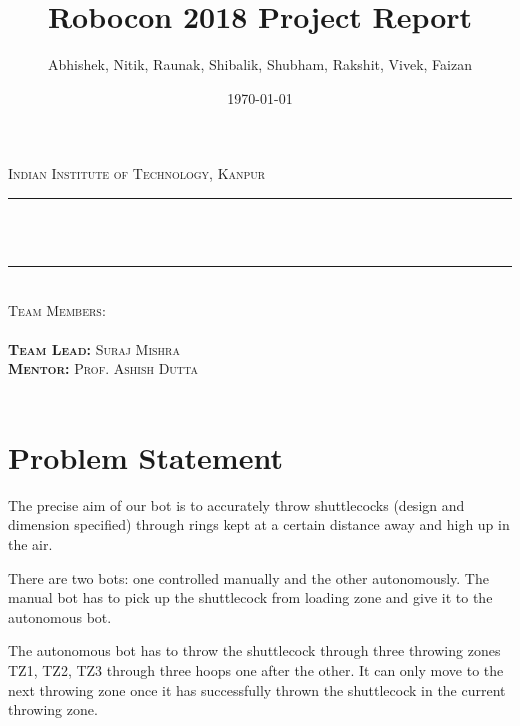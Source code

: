 \documentclass[11pt]{article}
\title{Robocon 2018 Project Report}%
\author{Abhishek, Nitik, Raunak, Shibalik, Shubham, Rakshit, Vivek, Faizan}%
\date{\today}%
\makeatletter
\let\thetitle\@title
\let\theauthor\@author
\let\thedate\@date
\makeatother
\begin{document}

\begin{titlepage}
    \centering
    \vspace*{0.5 cm}
    \textsc{\LARGE Indian Institute of Technology, Kanpur}\\[1 cm]   %
    \rule{\linewidth}{0.2 mm} \\[0.4 cm]
    { \huge \bfseries \thetitle}\\
    \rule{\linewidth}{0.2 mm} \\[1 cm]
    	\textsc{Team Members:}\\
    {\large \theauthor}\\[0.5 cm]
    	\textsc{\textbf{Team Lead:} Suraj Mishra}\\
        \textsc{\textbf{Mentor:} Prof. Ashish Dutta}\\[0.5 cm]
    {\large \thedate}\\[2 cm]
 
    \vfill
    
\end{titlepage}


\tableofcontents
\pagebreak


\section{Problem Statement}
The precise aim of our bot is to accurately throw shuttlecocks (design and dimension specified) through rings kept at a certain distance away and high up in the air.

There are two bots: one controlled manually and the other autonomously.
The manual bot has to pick up the shuttlecock from loading zone and give it to the autonomous bot.

The autonomous bot has to throw the shuttlecock through three throwing zones TZ1, TZ2, TZ3 through three hoops one after the other. It can only move to the next throwing zone once it has successfully thrown the shuttlecock in the current throwing zone.
\end{document}
